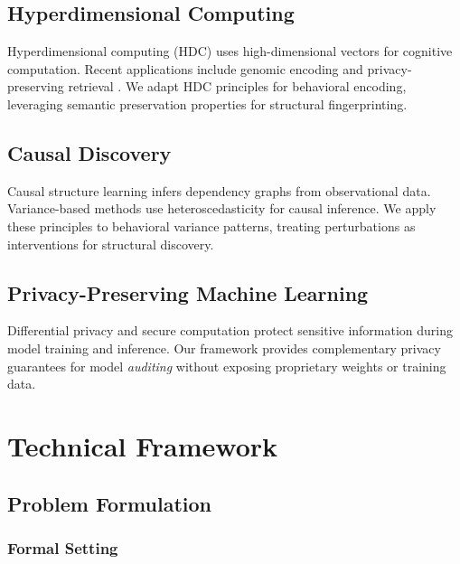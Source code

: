 \documentclass[11pt,a4paper]{article}
\begin{document}
\subsection{Hyperdimensional Computing}

Hyperdimensional computing (HDC) \citep{kanerva2009hyperdimensional,kleyko2021vector} uses high-dimensional vectors for cognitive computation. Recent applications include genomic encoding \citep{imani2018genomic} and privacy-preserving retrieval \citep{vinaik2024genomevault}. We adapt HDC principles for behavioral encoding, leveraging semantic preservation properties for structural fingerprinting.

\subsection{Causal Discovery}

Causal structure learning \citep{spirtes2000causation,pearl2009causality,peters2017elements} infers dependency graphs from observational data. Variance-based methods \citep{peters2014causal,buhlmann2014cam} use heteroscedasticity for causal inference. We apply these principles to behavioral variance patterns, treating perturbations as interventions for structural discovery.

\subsection{Privacy-Preserving Machine Learning}

Differential privacy \citep{dwork2006differential,abadi2016deep} and secure computation \citep{mohassel2017secureml} protect sensitive information during model training and inference. Our framework provides complementary privacy guarantees for model \textit{auditing} without exposing proprietary weights or training data.

\section{Technical Framework}

\subsection{Problem Formulation}

\subsubsection{Formal Setting}
\end{document}
